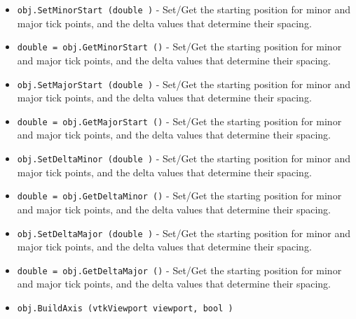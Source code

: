 \begin{itemize}
\item  \verb|obj.SetMinorStart (double )| -  Set/Get the starting position for minor and major tick points,
 and the delta values that determine their spacing. 

\item  \verb|double = obj.GetMinorStart ()| -  Set/Get the starting position for minor and major tick points,
 and the delta values that determine their spacing. 

\item  \verb|obj.SetMajorStart (double )| -  Set/Get the starting position for minor and major tick points,
 and the delta values that determine their spacing. 

\item  \verb|double = obj.GetMajorStart ()| -  Set/Get the starting position for minor and major tick points,
 and the delta values that determine their spacing. 

\item  \verb|obj.SetDeltaMinor (double )| -  Set/Get the starting position for minor and major tick points,
 and the delta values that determine their spacing. 

\item  \verb|double = obj.GetDeltaMinor ()| -  Set/Get the starting position for minor and major tick points,
 and the delta values that determine their spacing. 

\item  \verb|obj.SetDeltaMajor (double )| -  Set/Get the starting position for minor and major tick points,
 and the delta values that determine their spacing. 

\item  \verb|double = obj.GetDeltaMajor ()| -  Set/Get the starting position for minor and major tick points,
 and the delta values that determine their spacing. 

\item  \verb|obj.BuildAxis (vtkViewport viewport, bool )|

\end{itemize}
